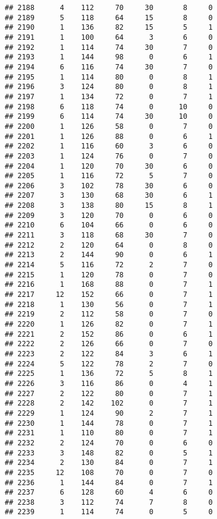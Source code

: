 \documentclass[
]{article}
\begin{document}
\begin{verbatim}
## 2188      4    112     70     30       8     0
## 2189      5    118     64     15       8     0
## 2190      1    136     82     15       5     1
## 2191      1    100     64      3       6     0
## 2192      1    114     74     30       7     0
## 2193      1    144     98      0       6     1
## 2194      6    116     74     30       7     0
## 2195      1    114     80      0       8     1
## 2196      3    124     80      0       8     1
## 2197      1    134     72      0       7     1
## 2198      6    118     74      0      10     0
## 2199      6    114     74     30      10     0
## 2200      1    126     58      0       7     0
## 2201      1    126     88      0       6     1
## 2202      1    116     60      3       6     0
## 2203      1    124     76      0       7     0
## 2204      1    120     70     30       6     0
## 2205      1    116     72      5       7     0
## 2206      3    102     78     30       6     0
## 2207      3    130     68     30       6     1
## 2208      3    138     80     15       8     1
## 2209      3    120     70      0       6     0
## 2210      6    104     66      0       6     0
## 2211      3    118     68     30       7     0
## 2212      2    120     64      0       8     0
## 2213      2    144     90      0       6     1
## 2214      5    116     72      2       7     0
## 2215      1    120     78      0       7     0
## 2216      1    168     88      0       7     1
## 2217     12    152     66      0       7     1
## 2218      1    130     56      0       7     1
## 2219      2    112     58      0       7     0
## 2220      1    126     82      0       7     1
## 2221      2    152     86      0       6     1
## 2222      2    126     66      0       7     0
## 2223      2    122     84      3       6     1
## 2224      5    122     78      2       7     0
## 2225      1    136     72      5       8     1
## 2226      3    116     86      0       4     1
## 2227      2    122     80      0       7     1
## 2228      2    142    102      0       7     1
## 2229      1    124     90      2       7     1
## 2230      1    144     78      0       7     1
## 2231      1    110     80      0       7     1
## 2232      2    124     70      0       6     0
## 2233      3    148     82      0       5     1
## 2234      2    130     84      0       7     1
## 2235     12    108     70      0       7     0
## 2236      1    144     84      0       7     1
## 2237      6    128     60      4       6     0
## 2238      3    112     74      7       8     0
## 2239      1    114     74      0       5     0

\end{verbatim}
\end{document}
